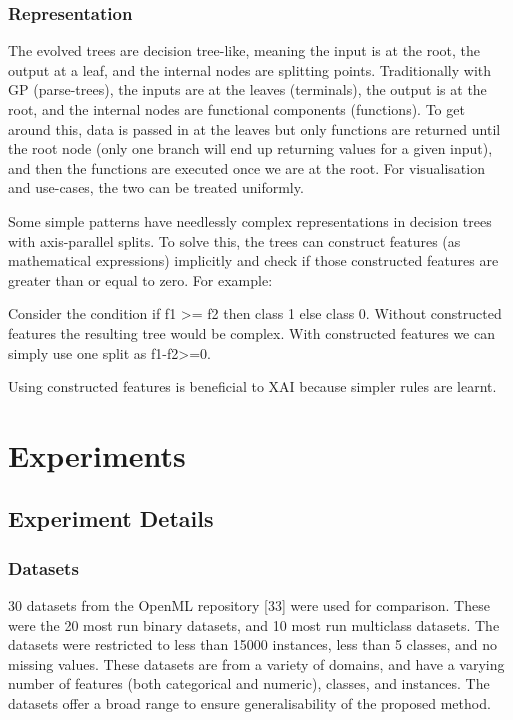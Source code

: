 \subsubsection{Representation}
The evolved trees are decision tree-like, meaning the input is at the root, the output at a leaf, and the internal nodes are splitting points. Traditionally with GP (parse-trees), the inputs are at the leaves (terminals), the output is at the root, and the internal nodes are functional components (functions). To get around this, data is passed in at the leaves but only functions are returned until the root node (only one branch will end up returning values for a given input), and then the functions are executed once we are at the root. For visualisation and use-cases, the two can be treated uniformly. 

Some simple patterns have needlessly complex representations in decision trees with axis-parallel splits. To solve this, the trees can construct features (as mathematical expressions) implicitly and check if those constructed features are greater than or equal to zero. For example: 
\begin{center}
Consider the condition if f1 >= f2 then class 1 else class 0. Without constructed features the resulting tree would be complex. With constructed features we can simply use one split as f1-f2>=0.
\end{center}

Using constructed features is beneficial to XAI because simpler rules are learnt.
\section{Experiments}
\subsection{Experiment Details}
\subsubsection{Datasets}
30 datasets from the OpenML repository [33] were used for comparison. These were the 20 most run binary datasets, and 10 most run multiclass datasets. The datasets were restricted to less than 15000 instances, less than 5 classes, and no missing values. These datasets are from a variety of domains, and have a varying number of features (both categorical and numeric), classes, and instances. The datasets offer a broad range to ensure generalisability of the proposed method.
